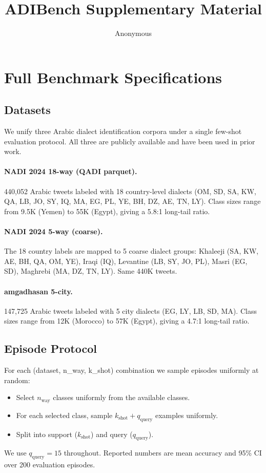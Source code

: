 \documentclass[11pt,a4paper]{article}
\title{ADIBench Supplementary Material}
\author{Anonymous}
\date{}
\begin{document}
\maketitle
\appendix

\section{Full Benchmark Specifications}

\subsection{Datasets}
We unify three Arabic dialect identification corpora under a single
few-shot evaluation protocol. All three are publicly available and
have been used in prior work.

\paragraph{NADI 2024 18-way (QADI parquet).}
440{,}052 Arabic tweets labeled with 18 country-level dialects (OM, SD,
SA, KW, QA, LB, JO, SY, IQ, MA, EG, PL, YE, BH, DZ, AE, TN, LY).
Class sizes range from 9.5K (Yemen) to 55K (Egypt), giving a
5.8:1 long-tail ratio.

\paragraph{NADI 2024 5-way (coarse).}
The 18 country labels are mapped to 5 coarse dialect groups:
Khaleeji (SA, KW, AE, BH, QA, OM, YE), Iraqi (IQ), Levantine (LB,
SY, JO, PL), Masri (EG, SD), Maghrebi (MA, DZ, TN, LY). Same
440K tweets.

\paragraph{amgadhasan 5-city.}
147{,}725 Arabic tweets labeled with 5 city dialects (EG, LY, LB, SD,
MA). Class sizes range from 12K (Morocco) to 57K (Egypt), giving a
4.7:1 long-tail ratio.

\subsection{Episode Protocol}
For each (dataset, n\_way, k\_shot) combination we sample
episodes uniformly at random:
\begin{itemize}
\itemsep0pt
\item Select $n_{\text{way}}$ classes uniformly from the available
      classes.
\item For each selected class, sample $k_{\text{shot}}+q_{\text{query}}$
      examples uniformly.
\item Split into support ($k_{\text{shot}}$) and query ($q_{\text{query}}$).
\end{itemize}
We use $q_{\text{query}}=15$ throughout. Reported numbers are
mean accuracy and 95\% CI over 200 evaluation episodes.
\end{document}
